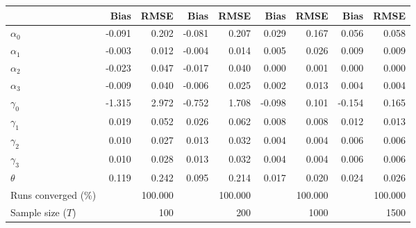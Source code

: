 
\begin{tabular}[t]{lrrrrrrrr}
\toprule
  & Bias & RMSE & Bias & RMSE & Bias & RMSE & Bias & RMSE\\
\midrule
$\alpha_{0}$ & -0.091 & 0.202 & -0.081 & 0.207 & 0.029 & 0.167 & 0.056 & 0.058\\
$\alpha_{1}$ & -0.003 & 0.012 & -0.004 & 0.014 & 0.005 & 0.026 & 0.009 & 0.009\\
$\alpha_{2}$ & -0.023 & 0.047 & -0.017 & 0.040 & 0.000 & 0.001 & 0.000 & 0.000\\
$\alpha_{3}$ & -0.009 & 0.040 & -0.006 & 0.025 & 0.002 & 0.013 & 0.004 & 0.004\\
$\gamma_{0}$ & -1.315 & 2.972 & -0.752 & 1.708 & -0.098 & 0.101 & -0.154 & 0.165\\
$\gamma_{1}$ & 0.019 & 0.052 & 0.026 & 0.062 & 0.008 & 0.008 & 0.012 & 0.013\\
$\gamma_{2}$ & 0.010 & 0.027 & 0.013 & 0.032 & 0.004 & 0.004 & 0.006 & 0.006\\
$\gamma_{3}$ & 0.010 & 0.028 & 0.013 & 0.032 & 0.004 & 0.004 & 0.006 & 0.006\\
$\theta$ & 0.119 & 0.242 & 0.095 & 0.214 & 0.017 & 0.020 & 0.024 & 0.026\\
Runs converged (\%) &  & 100.000 &  & 100.000 &  & 100.000 &  & 100.000\\
Sample size ($T$) &  & 100 &  & 200 &  & 1000 &  & 1500\\
\bottomrule
\end{tabular}
